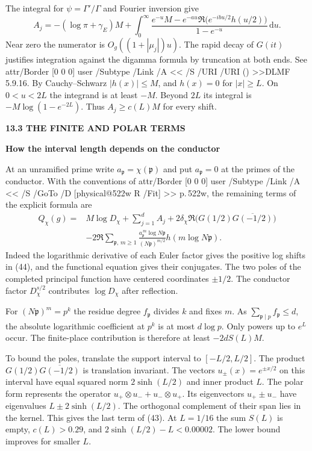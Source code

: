 \documentclass[11pt,letterpaper]{article}
\makeatletter
\newcommand{\rightmarktext}{}
\newcommand{\printfolio}{}
\newcommand{\leaf}[4]{\clearpage\gdef\printfolio{#1}\gdef\rightmarktext{#2}%
  {\small\sffamily\bfseries\color{ink}#3\par}\vspace{3pt}%
  {\LARGE\bfseries #4\par}\vspace{5pt}}
\newcommand{\dd}{\,\mathrm d}
\newcommand{\citetitle}[2]{\leavevmode\pdfstartlink attr{/Border [0 0 0]} user{%
 /Subtype /Link /A << /S /URI /URI (\pdfescapestring{\detokenize{#1}}) >>}{\color{ink}#2}\pdfendlink}
\newcommand{\MusicPDFPageRef}[1]{\pdfpageref\csname physical@#1\endcsname\space\space 0 R}
\newcommand{\pagelink}[2]{\leavevmode\pdfstartlink attr{/Border [0 0 0]} user{%
  /Subtype /Link /A << /S /GoTo /D [\MusicPDFPageRef{#1} /Fit] >>}%
  {\color{ink}#2}\pdfendlink}
\newcommand{\pg}[1]{\pagelink{#1}{p.\,#1}}
\makeatother
\begin{document}
The integral for $\psi=\Gamma'/\Gamma$ and Fourier inversion give
\[
 A_j=-(\log\pi+\gamma_E)M+
 \int_0^\infty
 \frac{e^{-u}M-e^{-au}\Re\!\big(e^{-ibu/2}h(u/2)\big)}
      {1-e^{-u}}\dd u .
\]
Near zero the numerator is $O_g((1+|\mu_j|)u)$. The rapid decay of $G(it)$ justifies
integration against the digamma formula by truncation at both ends.
See \citetitle{https://dlmf.nist.gov/5.9.E16}{DLMF 5.9.16}.
By Cauchy--Schwarz $|h(x)|\le M$, and $h(x)=0$ for $|x|\ge L$.
On $0<u<2L$ the integrand is at least $-M$. Beyond $2L$ its integral
is $-M\log(1-e^{-2L})$. Thus $A_j\ge c(L)M$ for every shift.

\leaf{522x}{Primes and conductors}{13.3 \quad THE FINITE AND POLAR TERMS}{How the interval length depends on the conductor}
At an unramified prime write $a_{\mathfrak p}=\chi(\mathfrak p)$ and
put $a_{\mathfrak p}=0$ at the primes of the conductor. With the
conventions of \pg{522w}, the remaining terms of the explicit formula are
\begin{align*}
 Q_\chi(g)={}&M\log D_\chi+\sum_{j=1}^d A_j+
     2\delta_\chi\Re\big(G(1/2)\overline{G(-1/2)}\big)\\
 &-2\Re\sum_{\mathfrak p,\,m\ge1}
 \frac{a_{\mathfrak p}^{\,m}\log N\mathfrak p}{(N\mathfrak p)^{m/2}}
                         h(m\log N\mathfrak p).
 \tag{44}
\end{align*}
Indeed the logarithmic derivative of each Euler factor gives the
positive log shifts in (44), and the functional equation gives their
conjugates. The two poles of the completed principal function have
centered coordinates $\pm1/2$. The conductor factor $D_\chi^{s/2}$
contributes $\log D_\chi$ after reflection.

For $(N\mathfrak p)^m=p^k$ the residue degree $f_{\mathfrak p}$ divides
$k$ and fixes $m$. As $\sum_{\mathfrak p\mid p}f_{\mathfrak p}\le d$,
the absolute logarithmic coefficient at $p^k$ is at most $d\log p$.
Only powers up to $e^L$ occur. The finite-place contribution is
therefore at least $-2d S(L)M$.

To bound the poles, translate the support interval to $[-L/2,L/2]$.
The product $G(1/2)\overline{G(-1/2)}$ is translation invariant. The
vectors $u_\pm(x)=e^{\pm x/2}$ on this interval have equal squared
norm $2\sinh(L/2)$ and inner product $L$. The polar form represents
the operator $u_+\otimes u_-+u_-\otimes u_+$. Its eigenvectors
$u_+\pm u_-$ have eigenvalues $L\pm2\sinh(L/2)$. The orthogonal
complement of their span lies in the kernel. This gives the last term of (43).
At $L=1/16$ the sum $S(L)$ is empty, $c(L)>0.29$, and
$2\sinh(L/2)-L<0.00002$. The lower bound improves for smaller $L$.
\end{document}
